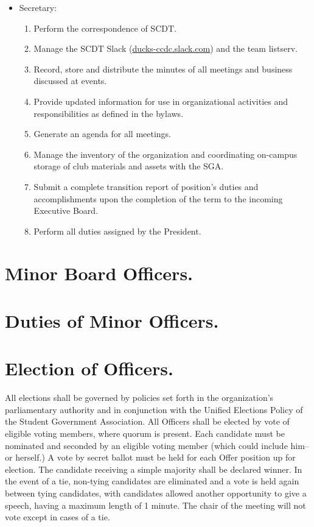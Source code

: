 \documentclass[12pt]{constitution}
\begin{document}
\begin{itemize}
    \item Secretary:
        \begin{enumerate}
            \item Perform the correspondence of SCDT.
            \item Manage the SCDT Slack (\url{ducks-ccdc.slack.com}) and the team listserv.
            \item Record, store and distribute the minutes of all meetings and
            business discussed at events.
            \item Provide updated information for use in organizational
            activities and responsibilities as defined in the bylaws.
            \item Generate an agenda for all meetings.
            \item Manage the inventory of the organization and coordinating
            on-campus storage of club materials and assets with the SGA.
            \item Submit a complete transition report of position’s duties and
            accomplishments upon the completion of the term to the incoming
            Executive Board.
            \item Perform all duties assigned by the President.
        \end{enumerate}
\end{itemize}

\section{Minor Board Officers.}\label{sec:MINOR-OFFICERS}

\section{Duties of Minor Officers.}\label{sec:MINOR-DUTIES}

\section{Election of Officers.}\label{sec:ELECTION-OF-OFFICERS}

All elections shall be governed by policies set forth in the organization’s
parliamentary authority and in conjunction with the Unified Elections Policy of
the Student Government Association. All Officers shall be elected by vote of
eligible voting members, where quorum is present. Each candidate must be
nominated and seconded by an eligible voting member (which could include him--
or herself.) A vote by secret ballot must be held for each Offer position up for
election. The candidate receiving a simple majority shall be declared winner. In
the event of a tie, non-tying candidates are eliminated and a vote is held again
between tying candidates, with candidates allowed another opportunity to give a
speech, having a maximum length of 1 minute. The chair of the meeting will not
vote except in cases of a tie.
\end{document}
